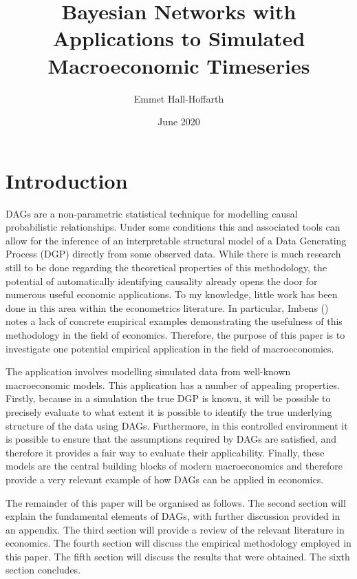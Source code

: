 \documentclass{article}
\title{Bayesian Networks with Applications to Simulated Macroeconomic Timeseries}
\author{Emmet Hall-Hoffarth}
\date{June 2020}
\begin{document}
\maketitle

\section{Introduction}

DAGs \parencite{pearl2018book} are a non-parametric statistical technique for modelling causal probabilistic relationships. Under some conditions this and associated tools can allow for the inference of an interpretable structural model of a Data Generating Process (DGP) directly from some observed data. While there is much research still to be done regarding the theoretical properties of this methodology, the potential of automatically identifying causality already opens the door for numerous useful economic applications. To my knowledge, little work has been done in this area within the econometrics literature. In particular, Imbens (\citeyear{imbens2019potential}) notes a lack of concrete empirical examples demonstrating the usefulness of this methodology in the field of economics. Therefore, the purpose of this paper is to investigate one potential empirical application in the field of macroeconomics. 

The application involves modelling simulated data from well-known macroeconomic models. This application has a number of appealing properties. Firstly, because in a simulation the true DGP is known, it will be possible to precisely evaluate to what extent it is possible to identify the true underlying structure of the data using DAGs. Furthermore, in this controlled environment it is possible to ensure that the assumptions required by DAGs are satisfied, and therefore it provides a fair way to evaluate their applicability. Finally, these models are the central building blocks of modern macroeconomics and therefore provide a very relevant example of how DAGs can be applied in economics.

The remainder of this paper will be organised as follows. The second section will explain the fundamental elements of DAGs, with further discussion provided in an appendix. The third section will provide a review of the relevant literature in economics. The fourth section will discuss the empirical methodology employed in this paper. The fifth section will discuss the results that were obtained. The sixth section concludes.
\end{document}
